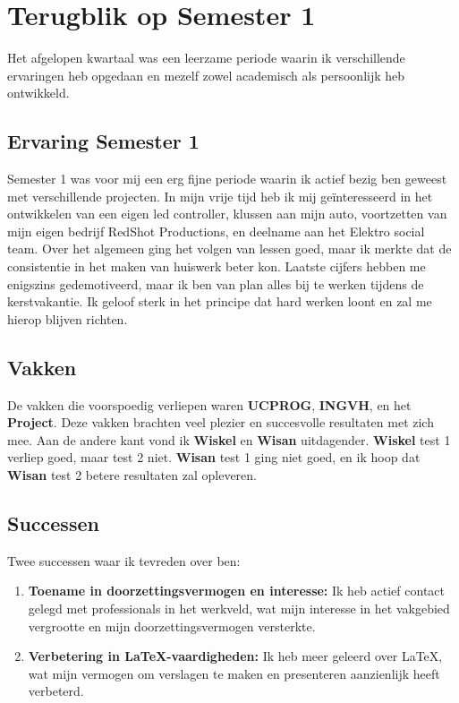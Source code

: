 \section{Terugblik op Semester 1}
Het afgelopen kwartaal was een leerzame periode waarin ik verschillende ervaringen heb opgedaan en mezelf zowel academisch als persoonlijk heb ontwikkeld.

\subsection{Ervaring Semester 1}
Semester 1 was voor mij een erg fijne periode waarin ik actief bezig ben geweest met verschillende projecten. In mijn vrije tijd heb ik mij geïnteresseerd in het ontwikkelen van een eigen led controller, klussen aan mijn auto, voortzetten van mijn eigen bedrijf RedShot Productions, en deelname aan het Elektro social team. Over het algemeen ging het volgen van lessen goed, maar ik merkte dat de consistentie in het maken van huiswerk beter kon. Laatste cijfers hebben me enigszins gedemotiveerd, maar ik ben van plan alles bij te werken tijdens de kerstvakantie. Ik geloof sterk in het principe dat hard werken loont en zal me hierop blijven richten.

\subsection{Vakken}
De vakken die voorspoedig verliepen waren \textbf{UCPROG}, \textbf{INGVH}, en het \textbf{Project}. Deze vakken brachten veel plezier en succesvolle resultaten met zich mee. Aan de andere kant vond ik \textbf{Wiskel} en \textbf{Wisan} uitdagender. \textbf{Wiskel} test 1 verliep goed, maar test 2 niet. \textbf{Wisan} test 1 ging niet goed, en ik hoop dat \textbf{Wisan} test 2 betere resultaten zal opleveren.

\subsection{Successen}
Twee successen waar ik tevreden over ben:

\begin{enumerate}
    \item \textbf{Toename in doorzettingsvermogen en interesse:} Ik heb actief contact gelegd met professionals in het werkveld, wat mijn interesse in het vakgebied vergrootte en mijn doorzettingsvermogen versterkte.
    \item \textbf{Verbetering in LaTeX-vaardigheden:} Ik heb meer geleerd over LaTeX, wat mijn vermogen om verslagen te maken en presenteren aanzienlijk heeft verbeterd.
\end{enumerate}

